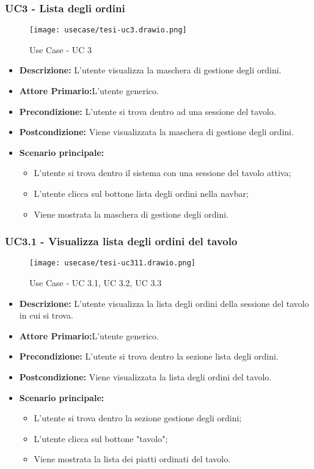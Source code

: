 \subsubsection{UC3 - Lista degli ordini}
\begin{figure}[H]
    \centering
    \texttt{[image: usecase/tesi-uc3.drawio.png]}
    \caption{Use Case - UC 3}
\end{figure}
\begin{itemize}
    \item \textbf{Descrizione:} L'utente visualizza la maschera di gestione degli ordini.
    \item \textbf{Attore Primario:}L'utente generico.
    \item \textbf{Precondizione:} L'utente si trova dentro ad una sessione del tavolo.
    \item \textbf{Postcondizione:} Viene visualizzata la maschera di gestione degli ordini.
    \item \textbf{Scenario principale:}
    \begin{itemize}
        \item L'utente si trova dentro il sistema con una sessione del tavolo attiva;
        \item L'utente clicca sul bottone lista degli ordini nella navbar;
        \item Viene mostrata la maschera di gestione degli ordini.
    \end{itemize}
\end{itemize}
\subsubsection{UC3.1 - Visualizza lista degli ordini del tavolo}
\begin{figure}[H]
    \centering
    \texttt{[image: usecase/tesi-uc311.drawio.png]}
    \caption{Use Case - UC 3.1, UC 3.2, UC 3.3}
\end{figure}
\begin{itemize}
    \item \textbf{Descrizione:} L'utente visualizza la lista degli ordini della sessione del tavolo in cui si trova. 
    \item \textbf{Attore Primario:}L'utente generico.
    \item \textbf{Precondizione:} L'utente si trova dentro la sezione lista degli ordini.
    \item \textbf{Postcondizione:} Viene visualizzata la lista degli ordini del tavolo.
    \item \textbf{Scenario principale:}
    \begin{itemize}
        \item L'utente si trova dentro la sezione gestione degli ordini;
        \item L'utente clicca sul bottone "tavolo";
        \item Viene mostrata la lista dei piatti ordinati del tavolo.
    \end{itemize}
\end{itemize}
